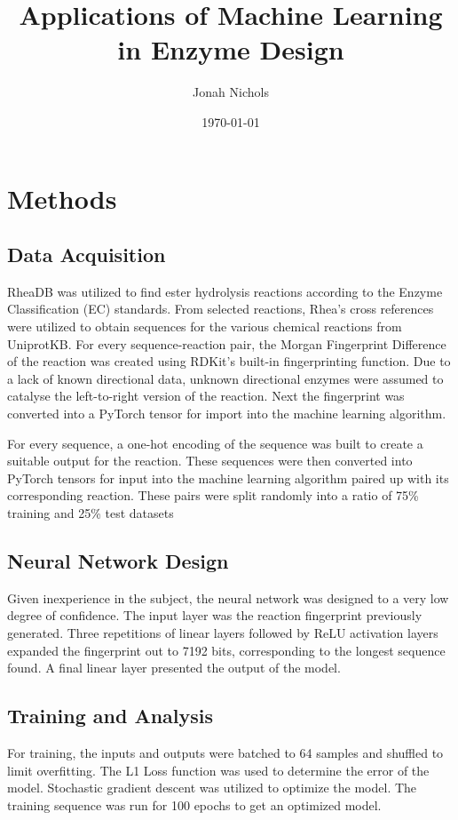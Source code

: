 \documentclass[12pt]{article}
\title{Applications of Machine Learning in Enzyme Design}
\author{Jonah Nichols}
\date{\today}
\begin{document}
\maketitle
\section{Methods}
\subsection{Data Acquisition}
RheaDB was utilized to find ester hydrolysis reactions according to the Enzyme Classification
(EC) standards. From selected reactions, Rhea's cross references were utilized
to obtain sequences for the various chemical reactions from UniprotKB. For every
sequence-reaction pair, the Morgan Fingerprint Difference of the reaction was created using
RDKit's built-in fingerprinting function. Due to a lack of known directional data,
unknown directional enzymes were assumed to catalyse the left-to-right version of
the reaction. Next the fingerprint was converted into a PyTorch tensor for import
into the machine learning algorithm.

For every sequence, a one-hot encoding of the sequence was built to create a suitable
output for the reaction. These sequences were then converted into PyTorch tensors
for input into the machine learning algorithm paired up with its corresponding reaction.
These pairs were split randomly into a ratio of 75\% training and 25\% test datasets

\subsection{Neural Network Design}
Given inexperience in the subject, the neural network was designed to a very low
degree of confidence. The input layer was the reaction fingerprint previously generated.
Three repetitions of linear layers followed by ReLU activation layers expanded the
fingerprint out to 7192 bits, corresponding to the longest sequence found. A final
linear layer presented the output of the model.

\subsection{Training and Analysis}
For training, the inputs and outputs were batched to 64 samples and shuffled to
limit overfitting. The L1 Loss function was used to determine the error of the
model. Stochastic gradient descent was utilized to optimize the model.
The training sequence was run for 100 epochs to get an optimized model.
\end{document}
